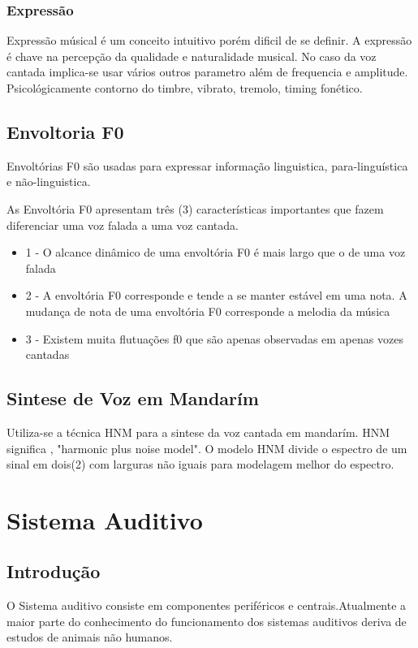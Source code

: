 		\subsubsection{Expressão}
		Expressão músical é um conceito intuitivo porém dificil de se definir. A expressão é chave na percepção da qualidade e naturalidade musical.
		No caso da voz cantada implica-se usar vários outros parametro além de frequencia e amplitude. Psicológicamente contorno do timbre, vibrato, tremolo, timing fonético.\cite{FrameWork}\linebreak
	
	
	\subsection{Envoltoria F0}
	
	Envoltórias F0 são usadas para expressar informação linguistica, para-linguística e não-linguistica.\cite{SaitouF0}
	\linebreak
	
	As Envoltória F0 apresentam três (3) características importantes que fazem diferenciar uma voz falada a uma voz cantada.\cite{SaitouNada}
	\linebreak
	\begin{itemize}
		\item 1 - O alcance dinâmico de uma envoltória F0 é mais largo que o de uma voz falada
		\item 2 - A envoltória F0 corresponde e tende a se manter estável em uma nota. A mudança de nota de uma envoltória F0 corresponde a melodia da música
		\item 3 - Existem muita flutuações f0 que são apenas observadas em apenas vozes cantadas
	\end{itemize}
	
	
	\subsection{Sintese de Voz em Mandarím}
		Utiliza-se a técnica HNM para a sintese da voz cantada em mandarím. HNM significa , "harmonic plus noise model".
		O modelo HNM divide o espectro de um sinal em dois(2) com larguras não iguais para modelagem melhor do espectro.\cite{LinRobos}
	

 

\section{Sistema Auditivo}
	\subsection{Introdução}
	O Sistema auditivo consiste em componentes periféricos e centrais.Atualmente a maior parte do conhecimento do funcionamento dos sistemas auditivos deriva de estudos de animais não humanos.\cite{Foundation1} 
	
